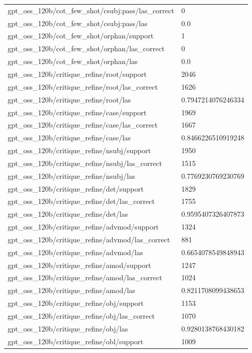\begin{tabular}{ll}
gpt\_oss\_120b/cot\_few\_shot/csubj:pass/las\_correct & 0 \\
gpt\_oss\_120b/cot\_few\_shot/csubj:pass/las & 0.0 \\
gpt\_oss\_120b/cot\_few\_shot/orphan/support & 1 \\
gpt\_oss\_120b/cot\_few\_shot/orphan/las\_correct & 0 \\
gpt\_oss\_120b/cot\_few\_shot/orphan/las & 0.0 \\
gpt\_oss\_120b/critique\_refine/root/support & 2046 \\
gpt\_oss\_120b/critique\_refine/root/las\_correct & 1626 \\
gpt\_oss\_120b/critique\_refine/root/las & 0.7947214076246334 \\
gpt\_oss\_120b/critique\_refine/case/support & 1969 \\
gpt\_oss\_120b/critique\_refine/case/las\_correct & 1667 \\
gpt\_oss\_120b/critique\_refine/case/las & 0.8466226510919248 \\
gpt\_oss\_120b/critique\_refine/nsubj/support & 1950 \\
gpt\_oss\_120b/critique\_refine/nsubj/las\_correct & 1515 \\
gpt\_oss\_120b/critique\_refine/nsubj/las & 0.7769230769230769 \\
gpt\_oss\_120b/critique\_refine/det/support & 1829 \\
gpt\_oss\_120b/critique\_refine/det/las\_correct & 1755 \\
gpt\_oss\_120b/critique\_refine/det/las & 0.9595407326407873 \\
gpt\_oss\_120b/critique\_refine/advmod/support & 1324 \\
gpt\_oss\_120b/critique\_refine/advmod/las\_correct & 881 \\
gpt\_oss\_120b/critique\_refine/advmod/las & 0.6654078549848943 \\
gpt\_oss\_120b/critique\_refine/amod/support & 1247 \\
gpt\_oss\_120b/critique\_refine/amod/las\_correct & 1024 \\
gpt\_oss\_120b/critique\_refine/amod/las & 0.8211708099438653 \\
gpt\_oss\_120b/critique\_refine/obj/support & 1153 \\
gpt\_oss\_120b/critique\_refine/obj/las\_correct & 1070 \\
gpt\_oss\_120b/critique\_refine/obj/las & 0.9280138768430182 \\
gpt\_oss\_120b/critique\_refine/obl/support & 1009 \\

\end{tabular}

